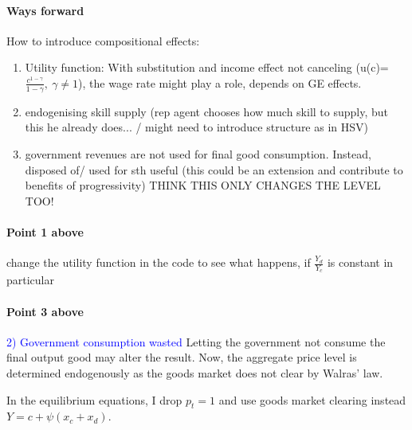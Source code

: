 \paragraph{Ways forward}
How to introduce compositional effects:
\begin{enumerate}
	\item 	Utility function: With substitution and income effect not canceling (u(c)=$\frac{c^{1-\gamma}}{1-\gamma},\ \gamma\neq 1$), the wage rate might play a role, depends on GE effects.
	\item endogenising skill supply (rep agent chooses how much skill to supply, but this he already does... / might need to introduce structure as in HSV)
	\item government revenues are not used for final good consumption. Instead,  disposed of/ used for sth useful (this could be an extension and contribute to benefits of progressivity) THINK THIS ONLY CHANGES THE LEVEL TOO!
\end{enumerate}
\paragraph{Point 1 above}
change the utility function in the code to see what happens, if $\frac{Y_d}{Y_c}$ is constant in particular 
\paragraph{Point 3 above}
\textcolor{blue}{2) Government consumption wasted}
Letting the government not consume the final output good may alter the result. 
Now, the aggregate price level is determined endogenously as the goods market does not clear by Walras' law. 

In the equilibrium equations, I drop $p_t=1$ and use goods market clearing instead\\ $Y=c+\psi (x_c+x_d)$.


